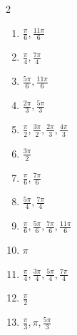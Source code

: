 \documentclass[11pt]{article}
\begin{document}
\begin{keybox}
\begin{multicols}{2}
\small
\begin{enumerate}[leftmargin=*,itemsep=3pt]
  \item $\tfrac{\pi}{6},\tfrac{11\pi}{6}$
  \item $\tfrac{\pi}{4},\tfrac{7\pi}{4}$
  \item $\tfrac{5\pi}{6},\tfrac{11\pi}{6}$
  \item $\tfrac{2\pi}{3},\tfrac{5\pi}{3}$
  \item $\tfrac{\pi}{2},\tfrac{3\pi}{2},\tfrac{2\pi}{3},\tfrac{4\pi}{3}$
  \item $\tfrac{3\pi}{2}$
  \item $\tfrac{\pi}{6},\tfrac{7\pi}{6}$
  \item $\tfrac{5\pi}{4},\tfrac{7\pi}{4}$
  \item $\tfrac{\pi}{6},\tfrac{5\pi}{6},\tfrac{7\pi}{6},\tfrac{11\pi}{6}$
  \item $\pi$
  \item $\tfrac{\pi}{4},\tfrac{3\pi}{4},\tfrac{5\pi}{4},\tfrac{7\pi}{4}$
  \item $\tfrac{\pi}{2}$
  \item $\tfrac{\pi}{3},\pi,\tfrac{5\pi}{3}$
\end{enumerate}
\end{multicols}
\end{keybox}
\end{document}
